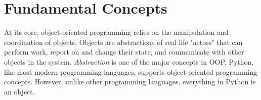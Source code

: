 \section*{Fundamental Concepts}

\begin{comment}
At its core, object oriented programming relies on the manipulation and coordination of objects.
An object represents a piece of code that tracks a state and provides methods for discovering or altering the state.


There are a few concepts that define object oriented programming

\begin{itemize}

\item Abstraction - appropriate representation of states and data

\item Encapsulation - independent behavior

\item Inheritance - relations between objects

\end{itemize}

The general advantage of using these concepts is that it helps with organizing code.
``Abstraction" permits the presentation of only necessary details about an object to the user.
For example, when we ask someone if they own a computer, we can use abstraction to ask the question ``Do you own a computer?'' rather than asking about each and every combination of hardware that we could classify as a computer.
Inheritance helps us easily achieve this abstraction.
We could have an object called \li{Computer}.
Various brands would then subclass, or inherit, the properties of \li{Computer}.
We could continue by having each product line inherit from their respective brands, until we arrive at the product level.
Then each individual product would represent an instantiation of that product's class.
Encapsulation means each function contains all of the data it needs to calculate a result.
Encapsulation is used to avoid the use of global data structures and makes managing data involved in computation more convenient.
\end{comment}

At its core, object-oriented programming relies on the manipulation and coordination of objects.
Objects are abstractions of real life "actors" that can perform work, report on and change their state, and communicate with other objects in the system. %
\emph{Abstraction} is one of the major concepts in OOP.
Python, like most modern programming languages, supports object oriented programming concepts.
However, unlike other programming languages, everything in Python is an object.

